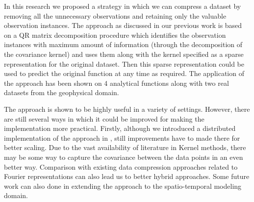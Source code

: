 \documentclass[procedia]{easychair}
\begin{document}
In this research we proposed a strategy in which we can compress a dataset by removing all the unnecessary observations and retaining only the valuable observation instances. The approach as discussed in our previous work \cite{patra2016multilevel} is based on a QR matrix decomposition procedure which identifies the observation instances with maximum amount of information (through the decomposition of the covariance kernel) and uses them along with the kernel specified as a sparse representation for the original dataset. Then this sparse representation could be used to predict the original function at any time as required. The application of the approach has been shown on 4 analytical functions along with two real datasets from the geophysical domain. 

The approach is shown to be highly useful in a variety of settings. However, there are still several ways in which it could be improved for making the implementation more practical. Firstly, although we introduced a distributed implementation of the approach in \cite{patra2016multilevel}, still improvements have to made there for better scaling. Due to the vast availability of literature in Kernel methods, there may be some way to capture the covariance between the data points in an even better way. Comparison with existing data compression approaches related to Fourier representations can also lead us to better hybrid approaches. Some future work can also  done in extending the approach to the spatio-temporal modeling domain.















































\end{document}
